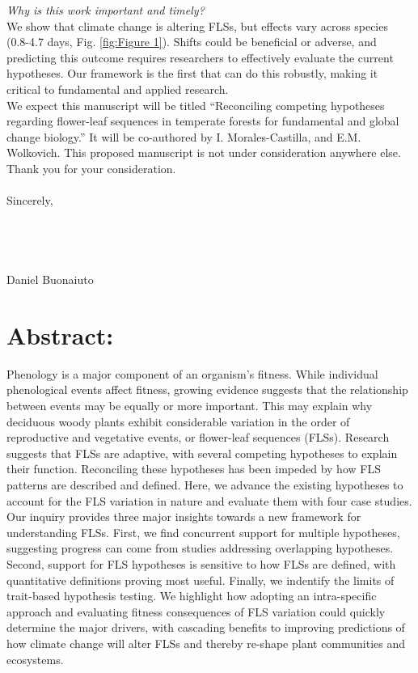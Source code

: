 \documentclass[11pt,a4paper]{article}
\begin{document}
\noindent \emph{Why is this work important and timely?}\\
\noindent We show that climate change is altering FLSs, but effects vary across species (0.8-4.7 days, Fig. \ref{fig:Figure 1}). Shifts could be beneficial or adverse, and predicting this outcome requires researchers to effectively evaluate the current hypotheses. Our framework is the first that can do this robustly, making it critical to fundamental and applied research.\\

 \noindent We expect this manuscript will be titled ``Reconciling competing hypotheses regarding flower-leaf sequences in temperate forests for fundamental and global change biology.'' It will be co-authored by I. Morales-Castilla, and E.M. Wolkovich. This proposed manuscript is not under consideration anywhere else. Thank you for your consideration.\\
\\Sincerely,\\\\\\\\\\

\noindent Daniel Buonaiuto\\

\newpage
\section*{Abstract:}
Phenology is a major component of an organism's fitness. While individual phenological events affect fitness, growing evidence suggests that the relationship between events may be equally or more important. This may explain why deciduous woody plants exhibit considerable variation in the order of reproductive and vegetative events, or flower-leaf sequences (FLSs). Research suggests that FLSs are adaptive, with several competing hypotheses to explain their function. Reconciling these hypotheses has been impeded by how FLS patterns are described and defined. Here, we advance the existing hypotheses to account for the FLS variation in nature and evaluate them with four case studies. Our inquiry provides three major insights towards a new framework for understanding FLSs. First, we find concurrent support for multiple hypotheses, suggesting progress can come from studies addressing overlapping hypotheses. Second, support for FLS hypotheses is sensitive to how FLSs are defined, with quantitative definitions proving most useful. Finally, we indentify the limits of trait-based hypothesis testing. We highlight how adopting an intra-specific approach and evaluating fitness consequences of FLS variation could quickly determine the major drivers, with cascading benefits to improving predictions of how climate change will alter FLSs and thereby re-shape plant communities and ecosystems. 
\end{document}
